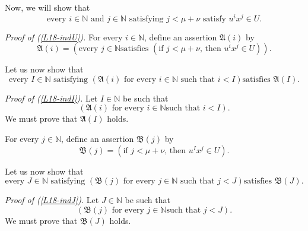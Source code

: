 \documentclass[12pt,final,notitlepage,onecolumn]{article}%
\begin{document}
Now, we will show that%
\begin{equation}
\text{every }i\in\mathbb{N}\text{ and }j\in\mathbb{N}\text{ satisfying }%
j<\mu+\nu\text{ satisfy }u^{i}x^{j}\in U. \label{L18-indU}%
\end{equation}


\textit{Proof of (\ref{L18-indU}).} For every $i\in\mathbb{N}$, define an
assertion $\mathfrak{A}\left(  i\right)  $ by%
\[
\mathfrak{A}\left(  i\right)  =\left(  \text{every }j\in\mathbb{N}\text{
satisfies }\left(  \text{if }j<\mu+\nu\text{, then }u^{i}x^{j}\in U\right)
\right)  .
\]


Let us now show that%
\begin{equation}
\text{every }I\in\mathbb{N}\text{ satisfying }\left(  \mathfrak{A}\left(
i\right)  \text{ for every }i\in\mathbb{N}\text{ such that }i<I\right)  \text{
satisfies }\mathfrak{A}\left(  I\right)  . \label{L18-indI}%
\end{equation}


\textit{Proof of (\ref{L18-indI}).} Let $I\in\mathbb{N}$ be such that%
\begin{equation}
\left(  \mathfrak{A}\left(  i\right)  \text{ for every }i\in\mathbb{N}\text{
such that }i<I\right)  . \label{L18-indIass}%
\end{equation}
We must prove that $\mathfrak{A}\left(  I\right)  $ holds.

For every $j\in\mathbb{N}$, define an assertion $\mathfrak{B}\left(  j\right)
$ by%
\[
\mathfrak{B}\left(  j\right)  =\left(  \text{if }j<\mu+\nu\text{, then }%
u^{I}x^{j}\in U\right)  .
\]


Let us now show that%
\begin{equation}
\text{every }J\in\mathbb{N}\text{ satisfying }\left(  \mathfrak{B}\left(
j\right)  \text{ for every }j\in\mathbb{N}\text{ such that }j<J\right)  \text{
satisfies }\mathfrak{B}\left(  J\right)  . \label{L18-indJ}%
\end{equation}


\textit{Proof of (\ref{L18-indJ}).} Let $J\in\mathbb{N}$ be such that%
\begin{equation}
\left(  \mathfrak{B}\left(  j\right)  \text{ for every }j\in\mathbb{N}\text{
such that }j<J\right)  . \label{L18-indJass}%
\end{equation}
We must prove that $\mathfrak{B}\left(  J\right)  $ holds.
\end{document}

